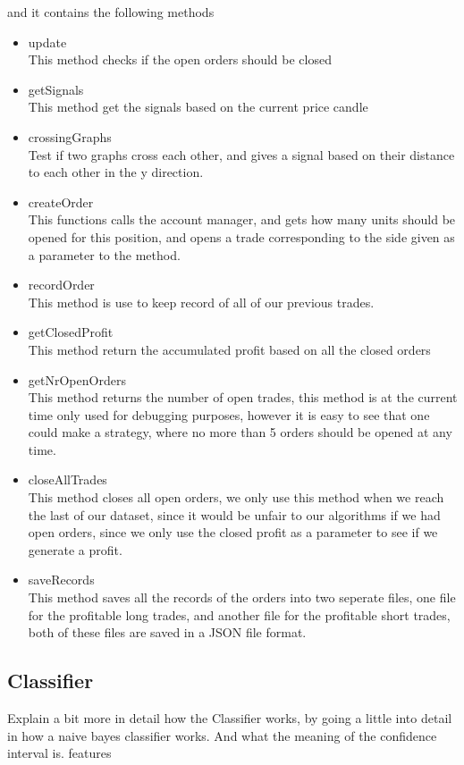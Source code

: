 and it contains the following methods
\begin{itemize}
\item{update}
\\
This method checks if the open orders should be closed
\item{getSignals}\\
This method get the signals based on the current price candle
\item{crossingGraphs}\\
Test if two graphs cross each other, and gives a signal based  on their distance to each other in the y direction.
\item{createOrder}\\
This functions calls the account manager, and gets how many units should be opened for this position, and opens a trade corresponding to the side given as a parameter to the method.
\item{recordOrder}\\
This method is use to keep record of all of our previous trades.
\item{getClosedProfit}\\
This method return the accumulated profit based on all the closed orders
\item{getNrOpenOrders}\\
This method returns the number of open trades, this method is at the current time only used for debugging purposes, however it is easy to see that one could make a strategy, where no more than 5 orders should be opened at any time.
\item{closeAllTrades}\\
This method closes all open orders, we only use this method when we reach the last of our dataset, since it would be unfair to our algorithms if we had open orders, since we only use the closed profit as a parameter to see if we generate a profit.
\item{saveRecords}\\
This method saves all the records of the orders into two seperate files, one file for the profitable long trades, and another file for the profitable short trades, both of these files are saved in a JSON file format.
\end{itemize}


\subsection{Classifier}
Explain a bit more in detail how the Classifier works, by going a little into detail in how a naive bayes classifier works. And what the meaning of the confidence interval is.
features